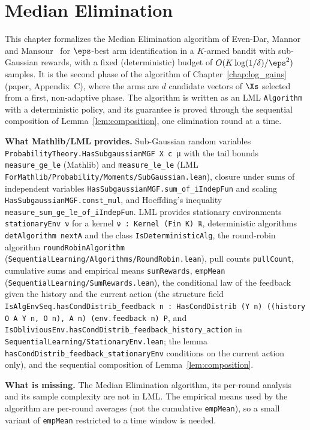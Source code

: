 \chapter{Median Elimination}
\label{chap:pre_median}

This chapter formalizes the Median Elimination algorithm of Even-Dar, Mannor and
Mansour~\cite{even2002pac,evendar2006action} for $\eps$-best arm identification in a
$K$-armed bandit with sub-Gaussian rewards, with a fixed (deterministic) budget of
$O(K\log(1/\delta)/\eps^2)$ samples. It is the second phase of the algorithm of
Chapter~\ref{chap:log_gains} (paper, Appendix~C), where the arms are $d$ candidate vectors of
$\Xs$ selected from a first, non-adaptive phase. The algorithm is written as an LML
\texttt{Algorithm} with a deterministic policy, and its guarantee is proved through the
sequential composition of Lemma~\ref{lem:composition}, one elimination round at a time.

\textbf{What Mathlib/LML provides.} Sub-Gaussian random variables
\texttt{ProbabilityTheory.HasSubgaussianMGF X c μ} with the tail bounds \texttt{measure\_ge\_le}
(Mathlib) and \texttt{measure\_le\_le} (LML \texttt{ForMathlib/Probability/Moments/SubGaussian.lean}),
closure under sums of independent variables \texttt{HasSubgaussianMGF.sum\_of\_iIndepFun} and scaling
\texttt{HasSubgaussianMGF.const\_mul}, and Hoeffding's inequality
\texttt{measure\_sum\_ge\_le\_of\_iIndepFun}. LML provides stationary environments
\texttt{stationaryEnv ν} for a kernel \texttt{ν : Kernel (Fin K) ℝ}, deterministic algorithms
\texttt{detAlgorithm nextA} and the class \texttt{IsDeterministicAlg}, the round-robin
algorithm \texttt{roundRobinAlgorithm} (\texttt{SequentialLearning/Algorithms/RoundRobin.lean}),
pull counts \texttt{pullCount}, cumulative sums and empirical means \texttt{sumRewards},
\texttt{empMean} (\texttt{SequentialLearning/SumRewards.lean}), the conditional law of the
feedback given the history and the current action (the structure field
\texttt{IsAlgEnvSeq.hasCondDistrib\_feedback n : HasCondDistrib (Y n) ((history O A Y n, O n), A n) (env.feedback n) P},
and \texttt{IsObliviousEnv.hasCondDistrib\_feedback\_history\_action} in
\texttt{SequentialLearning/StationaryEnv.lean}; the lemma
\texttt{hasCondDistrib\_feedback\_stationaryEnv} conditions on the current action only), and
the sequential composition of Lemma~\ref{lem:composition}.

\textbf{What is missing.} The Median Elimination algorithm, its per-round analysis and its
sample complexity are not in LML. The empirical means used by the algorithm are per-round
averages (not the cumulative \texttt{empMean}), so a small variant of \texttt{empMean}
restricted to a time window is needed.

